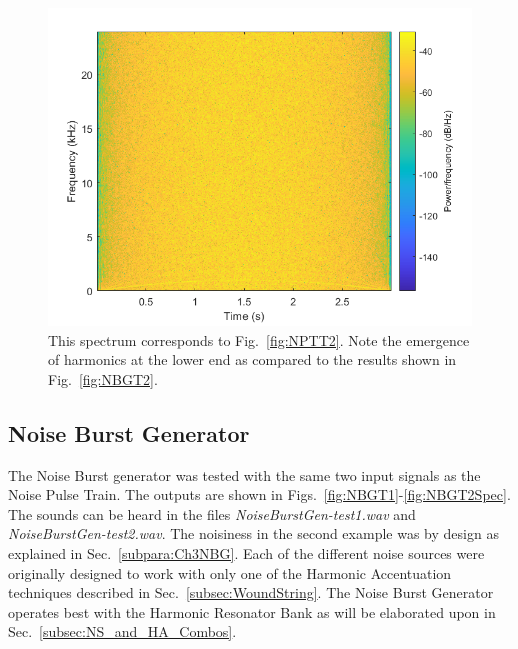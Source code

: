 \documentclass[../main.tex]{subfiles}
\begin{document}
\begin{figure}[h!]
    \centering
    \includegraphics[scale=.60]{./images/plots/NPTTest2Spectrum.png}
    \caption{This spectrum corresponds to Fig.~\ref{fig:NPTT2}. Note the emergence of harmonics at the lower end as compared to the results shown in Fig.~\ref{fig:NBGT2}.}
    \label{fig:NPTT2Spec}
\end{figure}

\clearpage

\subsection{Noise Burst Generator}
\label{sec:NBGVerify}
The Noise Burst generator was tested with the same two input signals as the Noise Pulse Train. The outputs are shown in Figs.~\ref{fig:NBGT1}-\ref{fig:NBGT2Spec}. The sounds can be heard in the files \emph{NoiseBurstGen-test1.wav} and \emph{NoiseBurstGen-test2.wav}. The noisiness in the second example was by design as explained in Sec.~\ref{subpara:Ch3NBG}. Each of the different noise sources were originally designed to work with only one of the Harmonic Accentuation techniques described in Sec.~\ref{subsec:WoundString}. The Noise Burst Generator operates best with the Harmonic Resonator Bank as will be elaborated upon in Sec.~\ref{subsec:NS_and_HA_Combos}.
\end{document}
